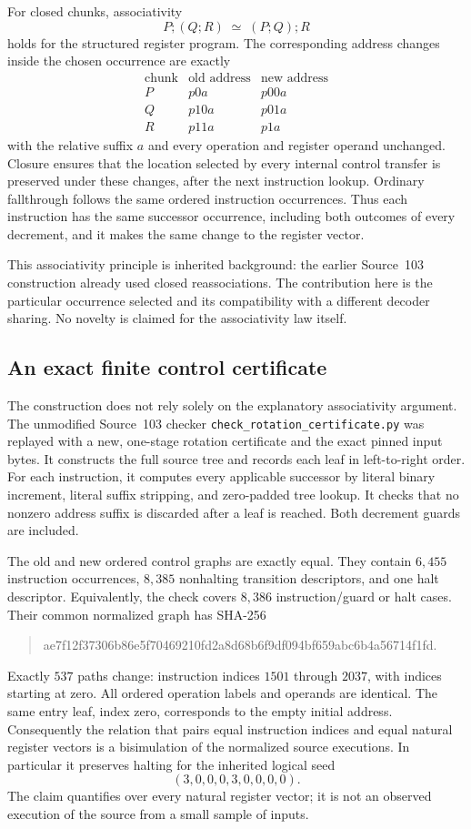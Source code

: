 For closed chunks, associativity
\[
 P;(Q;R)\;\simeq\;(P;Q);R
\]
holds for the structured register program.  The corresponding address changes
inside the chosen occurrence are exactly
\[
 \begin{array}{c|c|c}
 \text{chunk}&\text{old address}&\text{new address}\\ \hline
 P& p0a&p00a\\
 Q& p10a&p01a\\
 R& p11a&p1a
 \end{array}
\]
with the relative suffix $a$ and every operation and register operand unchanged.
Closure ensures that the location selected by every internal control transfer
is preserved under these changes, after the next instruction lookup.  Ordinary
fallthrough follows the same ordered instruction occurrences.  Thus each
instruction has the same successor occurrence, including both outcomes of every
decrement, and it makes the same change to the register vector.

This associativity principle is inherited background: the earlier Source~103
construction already used closed reassociations.  The contribution here is the
particular occurrence selected and its compatibility with a different decoder
sharing.  No novelty is claimed for the associativity law itself.

\subsection{An exact finite control certificate}

The construction does not rely solely on the explanatory associativity argument.
The unmodified Source~103 checker \texttt{check\_rotation\_certificate.py} was
replayed with a new, one-stage rotation certificate and the exact pinned input
bytes.  It constructs the full source tree and records each leaf in left-to-right
order.  For each instruction, it computes every applicable successor by literal
binary increment, literal suffix stripping, and zero-padded tree lookup.  It
checks that no nonzero address suffix is discarded after a leaf is reached.
Both decrement guards are included.

The old and new ordered control graphs are exactly equal.  They contain $6{,}455$
instruction occurrences, $8{,}385$ nonhalting transition descriptors, and one halt
descriptor.  Equivalently, the check covers $8{,}386$ instruction/guard or halt
cases.  Their common normalized graph has SHA-256
\begin{quote}\small\ttfamily
 ae7f12f37306b86e5f70469210fd2a8d68b6f9df094bf659abc6b4a56714f1fd.
\end{quote}
Exactly $537$ paths change: instruction indices $1501$ through $2037$, with indices
starting at zero.  All ordered operation labels and operands are identical.
The same entry leaf, index zero, corresponds to the empty initial address.
Consequently the relation that pairs equal instruction indices and equal natural
register vectors is a bisimulation of the normalized source executions.  In
particular it preserves halting for the inherited logical seed
\[
 (3,0,0,0,3,0,0,0,0).
\]
The claim quantifies over every natural register vector; it is not an observed
execution of the source from a small sample of inputs.

